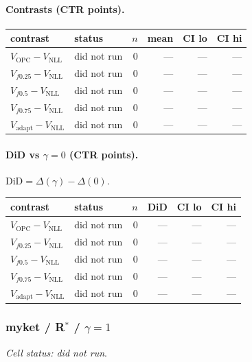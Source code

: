 \documentclass[10pt,a4paper]{article}
\begin{document}
\paragraph{Contrasts (CTR points).}
{\centering\small\begin{tabular}{llrrrr}
\toprule contrast & status & $n$ & mean & CI lo & CI hi \\
\midrule
$V_{\mathrm{OPC}}-V_{\mathrm{NLL}}$ & did not run & 0 & --- & --- & --- \\
$V_{f0.25}-V_{\mathrm{NLL}}$ & did not run & 0 & --- & --- & --- \\
$V_{f0.5}-V_{\mathrm{NLL}}$ & did not run & 0 & --- & --- & --- \\
$V_{f0.75}-V_{\mathrm{NLL}}$ & did not run & 0 & --- & --- & --- \\
$V_{\mathrm{adapt}}-V_{\mathrm{NLL}}$ & did not run & 0 & --- & --- & --- \\
\bottomrule\end{tabular}\par}
\paragraph{DiD vs $\gamma=0$ (CTR points).} $\mathrm{DiD}=\Delta(\gamma)-\Delta(0)$.
{\centering\small\begin{tabular}{llrrrr}
\toprule contrast & status & $n$ & DiD & CI lo & CI hi \\
\midrule
$V_{\mathrm{OPC}}-V_{\mathrm{NLL}}$ & did not run & 0 & --- & --- & --- \\
$V_{f0.25}-V_{\mathrm{NLL}}$ & did not run & 0 & --- & --- & --- \\
$V_{f0.5}-V_{\mathrm{NLL}}$ & did not run & 0 & --- & --- & --- \\
$V_{f0.75}-V_{\mathrm{NLL}}$ & did not run & 0 & --- & --- & --- \\
$V_{\mathrm{adapt}}-V_{\mathrm{NLL}}$ & did not run & 0 & --- & --- & --- \\
\bottomrule\end{tabular}\par}
\bigskip
\subsubsection{myket / R$^*$ / $\gamma=1$}
\emph{Cell status: did not run}.
\end{document}
